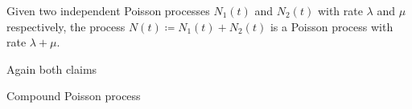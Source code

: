 \documentclass[10pt]{book}
\begin{document}
\begin{thm}
    Given two independent Poisson processes $N_1(t)$ and $N_2(t)$ with rate $\lambda$ and $\mu$ respectively, the process $N(t) \coloneqq N_1(t)+N_2(t)$ is a Poisson process with rate $\lambda + \mu$.
\end{thm}

Again both claims 

Compound Poisson process





\end{document}
